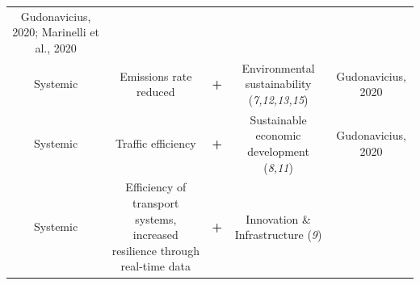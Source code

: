 \documentclass[
]{book}
\begin{document}
\begin{longtable}[]{@{}ccccc@{}}
\begin{minipage}[t]{0.17\columnwidth}
Gudonavicius, 2020; Marinelli et al., 2020\strut
\end{minipage}\tabularnewline
\begin{minipage}[t]{0.17\columnwidth}\centering
Systemic\strut
\end{minipage} & \begin{minipage}[t]{0.16\columnwidth}\centering
Emissions rate reduced\strut
\end{minipage} & \begin{minipage}[t]{0.17\columnwidth}\centering
\textbf{+}\strut
\end{minipage} & \begin{minipage}[t]{0.17\columnwidth}\centering
Environmental sustainability (\emph{7,12,13,15})\strut
\end{minipage} & \begin{minipage}[t]{0.17\columnwidth}\centering
Gudonavicius, 2020\strut
\end{minipage}\tabularnewline
\begin{minipage}[t]{0.17\columnwidth}\centering
Systemic\strut
\end{minipage} & \begin{minipage}[t]{0.16\columnwidth}\centering
Traffic efficiency\strut
\end{minipage} & \begin{minipage}[t]{0.17\columnwidth}\centering
\textbf{+}\strut
\end{minipage} & \begin{minipage}[t]{0.17\columnwidth}\centering
Sustainable economic development (\emph{8,11})\strut
\end{minipage} & \begin{minipage}[t]{0.17\columnwidth}\centering
Gudonavicius, 2020\strut
\end{minipage}\tabularnewline
\begin{minipage}[t]{0.17\columnwidth}\centering
Systemic\strut
\end{minipage} & \begin{minipage}[t]{0.16\columnwidth}\centering
Efficiency of transport systems, increased resilience through real-time data\strut
\end{minipage} & \begin{minipage}[t]{0.17\columnwidth}\centering
\textbf{+}\strut
\end{minipage} & \begin{minipage}[t]{0.17\columnwidth}\centering
Innovation \& Infrastructure (\emph{9})\strut
\end{minipage} & \begin{minipage}[t]{0.17\columnwidth}\centering

\end{minipage}
\end{longtable}
\end{document}
